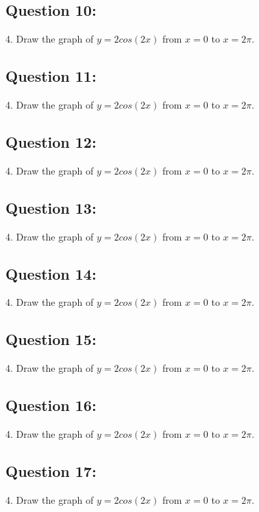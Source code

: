 \documentclass[12pt, letterpaper]{article}
\begin{document}
\subsection{Question 10:}
4. Draw the graph of $y=2cos(2x)$ from $x=0$ to $x=2\pi$.

\subsection{Question 11:}
4. Draw the graph of $y=2cos(2x)$ from $x=0$ to $x=2\pi$.

\subsection{Question 12:}
4. Draw the graph of $y=2cos(2x)$ from $x=0$ to $x=2\pi$.

\subsection{Question 13:}
4. Draw the graph of $y=2cos(2x)$ from $x=0$ to $x=2\pi$.

\subsection{Question 14:}
4. Draw the graph of $y=2cos(2x)$ from $x=0$ to $x=2\pi$.

\subsection{Question 15:}
4. Draw the graph of $y=2cos(2x)$ from $x=0$ to $x=2\pi$.

\subsection{Question 16:}
4. Draw the graph of $y=2cos(2x)$ from $x=0$ to $x=2\pi$.

\subsection{Question 17:}
4. Draw the graph of $y=2cos(2x)$ from $x=0$ to $x=2\pi$.
\end{document}
